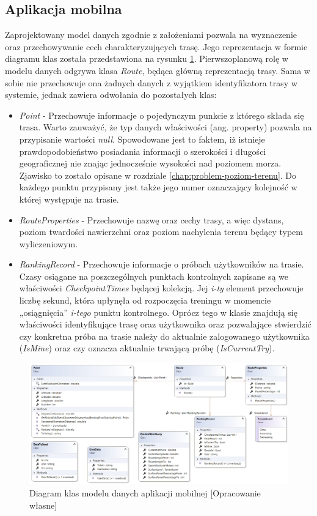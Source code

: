 \subsection{Aplikacja mobilna}\label{chap:model-mobilna}
Zaprojektowany model danych zgodnie z założeniami pozwala na wyznaczenie oraz przechowywanie cech charakteryzujących trasę. Jego reprezentacja w formie diagramu klas została przedstawiona na rysunku \ref{image:xamarin_model}. Pierwszoplanową rolę w modelu danych odgrywa klasa \textit{Route}, będąca główną reprezentacją trasy. Sama w sobie nie przechowuje ona żadnych danych z wyjątkiem identyfikatora trasy w systemie, jednak zawiera odwołania do pozostałych klas:
\begin{itemize}
\item{\textit{Point}} - Przechowuje informacje o pojedynczym punkcie z którego składa się trasa. Warto zauważyć, że typ danych właściwości (ang. {property}) pozwala na przypisanie wartości \textit{null}. Spowodowane jest to faktem, iż istnieje prawdopodobieństwo posiadania informacji o szerokości i długości geograficznej nie znając jednocześnie wysokości nad poziomem morza. Zjawisko to zostało opisane w rozdziale \ref{chap:problem-poziom-terenu}. Do każdego punktu przypisany jest także jego numer oznaczający kolejność w której występuje na trasie.
\item{\textit{RouteProperties}} - Przechowuje nazwę oraz cechy trasy, a więc dystans, poziom twardości nawierzchni oraz poziom nachylenia terenu będący typem wyliczeniowym.
\item{\textit{RankingRecord}} - Przechowuje informacje o próbach użytkowników na trasie. Czasy osiągane na poszczególnych punktach kontrolnych zapisane są we właściwości \textit{CheckpointTimes} będącej kolekcją. Jej \textit{i-ty} element przechowuje liczbę sekund, która upłynęła od rozpoczęcia treningu w momencie „osiągnięcia” \textit{i-tego} punktu kontrolnego. Oprócz tego w klasie znajdują się właściwości identyfikujące trasę oraz użytkownika oraz pozwalające stwierdzić czy konkretna próba na trasie należy do aktualnie zalogowanego użytkownika (\textit{IsMine}) oraz czy oznacza aktualnie trwającą próbę (\textit{IsCurrentTry}).
\end{itemize}
\begin{figure}[h]\label{fig:xamarin_model}
\begin{center}
\includegraphics[width=\textwidth]{img/xamarin_model.png}
\caption{Diagram klas modelu danych aplikacji mobilnej [Opracowanie własne]}\label{image:xamarin_model}
\end{center}
\end{figure}
